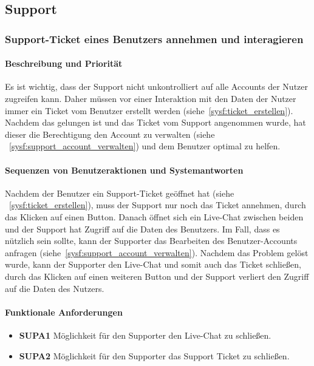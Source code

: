 
\subsection{Support}
\subsubsection{Support-Ticket eines Benutzers annehmen und \label{sysf:ticket_annehmen}
	interagieren}
\paragraph{Beschreibung und Priorität}
Es ist wichtig, dass der Support nicht unkontrolliert auf alle Accounts der Nutzer zugreifen kann.
Daher müssen vor einer Interaktion mit den Daten der Nutzer immer ein Ticket vom Benutzer erstellt werden (siehe~\ref{sysf:ticket_erstellen}).
Nachdem das gelungen ist und das Ticket vom Support angenommen wurde, hat dieser die Berechtigung
den Account zu verwalten (siehe ~\ref{sysf:support_account_verwalten}) und dem Benutzer optimal zu helfen.
\paragraph{Sequenzen von Benutzeraktionen und Systemantworten}
Nachdem der Benutzer ein Support-Ticket geöffnet hat (siehe ~\ref{sysf:ticket_erstellen}), muss der Support
nur noch das Ticket annehmen, durch das Klicken auf einen Button.
Danach öffnet sich ein Live-Chat zwischen beiden und der Support hat Zugriff auf die Daten des Benutzers.
Im Fall, dass es nützlich sein sollte, kann der Supporter das Bearbeiten des Benutzer-Accounts anfragen (siehe~\ref{sysf:support_account_verwalten}).
Nachdem das Problem gelöst wurde, kann der Supporter den Live-Chat und somit auch das Ticket schließen,
durch das Klicken auf einen weiteren Button
und der Support verliert den Zugriff auf die Daten des Nutzers.
\paragraph{Funktionale Anforderungen}
\begin{itemize}
	\item \textbf{SUPA1} Möglichkeit für den Supporter den Live-Chat zu schließen.
	\item \textbf{SUPA2} Möglichkeit für den Supporter das Support Ticket zu schließen.
\end{itemize}

